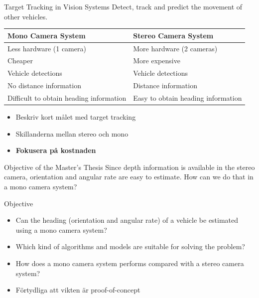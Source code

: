 \documentclass{beamer}
\renewcommand{\a}{\r{a}\xspace}
\renewcommand{\aa}{\"a\xspace}
\renewcommand{\o}{\"o\xspace}
\begin{document}
\begin{frame}{Target Tracking in Vision Systems}
	Detect, track and predict the movement of other vehicles.
	\begin{table}
		\centering
		\renewcommand{\arraystretch}{1.25}
		\setlength{\arrayrulewidth}{0.5pt}
		\begin{tabular}{p{5cm}|p{5cm}}
			\textbf{Mono Camera System} & \textbf{Stereo Camera System} \\
			\hline \hline
			Less hardware (1 camera) & More hardware (2 cameras) \\ \hline
            Cheaper & More expensive \\ \hline
			Vehicle detections & Vehicle detections \\ \hline
			No distance information & Distance information \\ \hline
			Difficult to obtain heading information & Easy to obtain heading information
		\end{tabular}
	\end{table}

	\note
	{
		\begin{itemize}
			\item Beskriv kort m\a{}let med target tracking
			\item Skillanderna mellan stereo och mono
			\item \textbf{Fokusera p\a{} kostnaden}
		\end{itemize}
	}
\end{frame}

\begin{frame}{Objective of the Master's Thesis}
	Since depth information is available in the stereo camera, orientation and angular rate are easy to estimate.
	How can we do that in a mono camera system?
	\pause
	\begin{block}{Objective}
		\begin{itemize}
			\item Can the heading (orientation and angular rate) of a vehicle be estimated using a mono camera system?
			\item Which kind of algorithms and models are suitable for solving the problem?
			\item How does a mono camera system performs compared with a stereo camera system?
		\end{itemize}
	\end{block}

	\note
	{
		\begin{itemize}
			\item F\o{}rtydliga att vikten \aa{}r proof-of-concept
		\end{itemize}
	}
\end{frame}
\end{document}
